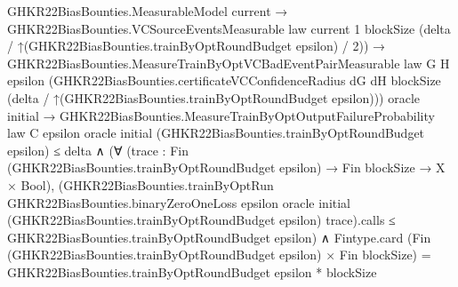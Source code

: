 \documentclass[10pt]{article}
\begin{document}
\begin{ReviewVerbatim}
                                                GHKR22BiasBounties.MeasurableModel current →
                                                  GHKR22BiasBounties.VCSourceEventsMeasurable law {current} 1 blockSize
                                                    (delta / ↑(GHKR22BiasBounties.trainByOptRoundBudget epsilon) / 2)) →
                                              GHKR22BiasBounties.MeasureTrainByOptVCBadEventPairMeasurable law G H
                                                  epsilon
                                                  (GHKR22BiasBounties.certificateVCConfidenceRadius dG dH blockSize
                                                    (delta / ↑(GHKR22BiasBounties.trainByOptRoundBudget epsilon)))
                                                  oracle initial →
                                                GHKR22BiasBounties.MeasureTrainByOptOutputFailureProbability law C
                                                      epsilon oracle initial
                                                      (GHKR22BiasBounties.trainByOptRoundBudget epsilon) ≤
                                                    delta ∧
                                                  (∀
                                                      (trace :
                                                        Fin (GHKR22BiasBounties.trainByOptRoundBudget epsilon) →
                                                          Fin blockSize → X × Bool),
                                                      (GHKR22BiasBounties.trainByOptRun
                                                            GHKR22BiasBounties.binaryZeroOneLoss epsilon oracle initial
                                                            (GHKR22BiasBounties.trainByOptRoundBudget epsilon)
                                                            trace).calls ≤
                                                        GHKR22BiasBounties.trainByOptRoundBudget epsilon) ∧
                                                    Fintype.card
                                                        (Fin (GHKR22BiasBounties.trainByOptRoundBudget epsilon) ×
                                                          Fin blockSize) =
                                                      GHKR22BiasBounties.trainByOptRoundBudget epsilon * blockSize
\end{ReviewVerbatim}
\end{document}
